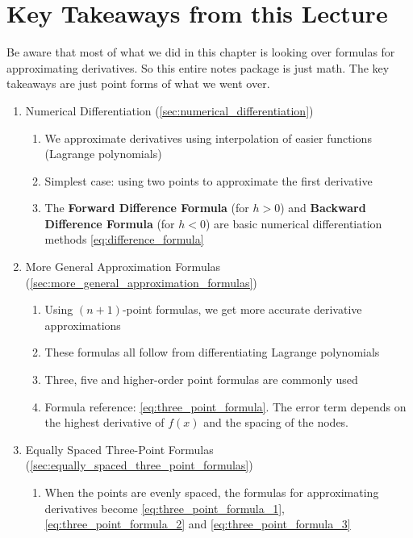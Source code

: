 \section*{Key Takeaways from this Lecture}

Be aware that most of what we did in this chapter is looking over formulas for
approximating derivatives. So this entire notes package is just math. The key
takeaways are just point forms of what we went over.

\begin{enumerate}
  \item Numerical Differentiation (\ref{sec:numerical_differentiation})
    \begin{enumerate}[label=(\alph*)]
      \item We approximate derivatives using interpolation of easier functions 
        (\ex Lagrange polynomials)
      \item Simplest case: using two points to approximate the first derivative
      \item The \textbf{Forward Difference Formula} (for $h>0$) and
        \textbf{Backward Difference Formula} (for $h<0$) are basic numerical
        differentiation methods \eqref{eq:difference_formula}
    \end{enumerate}
  \item More General Approximation Formulas (\ref{sec:more_general_approximation_formulas})
    \begin{enumerate}[label=(\alph*)]
      \item Using $(n+1)$-point formulas, we get more accurate derivative
        approximations
      \item These formulas all follow from differentiating Lagrange polynomials
      \item Three, five and higher-order point formulas are commonly used
      \item Formula reference: \eqref{eq:three_point_formula}. The error term
        depends on the highest derivative of $f(x)$ and the spacing of the
        nodes.
    \end{enumerate}
  \item Equally Spaced Three-Point Formulas (\ref{sec:equally_spaced_three_point_formulas})
    \begin{enumerate}[label=(\alph*)]
      \item When the points are evenly spaced, the formulas for approximating
        derivatives become \eqref{eq:three_point_formula_1}, \eqref{eq:three_point_formula_2}
        and \eqref{eq:three_point_formula_3}

\end{enumerate}
\end{enumerate}

